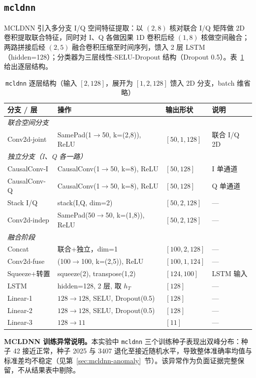 \subsection{\texttt{mcldnn}}

MCLDNN 引入多分支 I/Q 空间特征提取\cite{xu2020mcldnn}：以 \((2,8)\) 核对联合 I/Q 矩阵做 2D 卷积提取联合特征，同时对 I、Q 各做因果 1D 卷积后经 \((1,8)\) 核做空间融合；两路拼接后经 \((2,5)\) 融合卷积压缩至时间序列，馈入 2 层 LSTM（hidden=128）；分类器为三层线性-SELU-Dropout 结构（Dropout 0.5）。表~\ref{tab:arch-mcldnn} 给出逐层结构。

\begin{table}[htbp]
  \centering
  \caption{\texttt{mcldnn} 逐层结构（输入 \([2,128]\)，展开为 \([1,2,128]\) 馈入 2D 分支，batch 维省略）}
  \label{tab:arch-mcldnn}
  \small
  \begin{tabular}{llll}
    \toprule
    分支 / 层 & 操作 & 输出形状 & 说明 \\
    \midrule
    \multicolumn{4}{l}{\textit{联合空间分支}} \\
    \quad Conv2d-joint & SamePad(1\(\to\)50, k=(2,8)), ReLU  & \([50,1,128]\) & 联合 I/Q 2D \\
    \multicolumn{4}{l}{\textit{独立分支（I、Q 各一路）}} \\
    \quad CausalConv-I & CausalConv(1\(\to\)50, k=8), ReLU   & \([50,128]\)   & I 单通道 \\
    \quad CausalConv-Q & CausalConv(1\(\to\)50, k=8), ReLU   & \([50,128]\)   & Q 单通道 \\
    \quad Stack I/Q    & stack(I,Q, dim=2)                    & \([50,2,128]\) & --- \\
    \quad Conv2d-indep & SamePad(50\(\to\)50, k=(1,8)), ReLU & \([50,2,128]\) & --- \\
    \multicolumn{4}{l}{\textit{融合阶段}} \\
    \quad Concat        & 联合+独立，dim=1                    & \([100,2,128]\) & --- \\
    \quad Conv2d-fuse   & (100\(\to\)100, k=(2,5)), ReLU      & \([100,1,124]\) & --- \\
    \quad Squeeze+转置  & squeeze(2), transpose(1,2)          & \([124,100]\)  & LSTM 输入 \\
    \quad LSTM          & hidden=128, 2 层, 取 \(h_T\)       & \([128]\)      & --- \\
    \quad Linear-1      & \(128\to128\), SELU, Dropout(0.5)  & \([128]\)      & --- \\
    \quad Linear-2      & \(128\to128\), SELU, Dropout(0.5)  & \([128]\)      & --- \\
    \quad Linear-3      & \(128\to11\)                        & \([11]\)       & --- \\
    \bottomrule
  \end{tabular}
\end{table}
\noindent\textbf{MCLDNN 训练异常说明。}本实验中 \texttt{mcldnn} 三个训练种子表现出双峰分布：种子 42 接近正常，种子 2025 与 3407 退化至接近随机水平，导致整体准确率均值与标准差均不稳定（见第~\ref{sec:mcldnn-anomaly}~节）。该异常作为负面证据完整保留，不从结果表中剔除。

